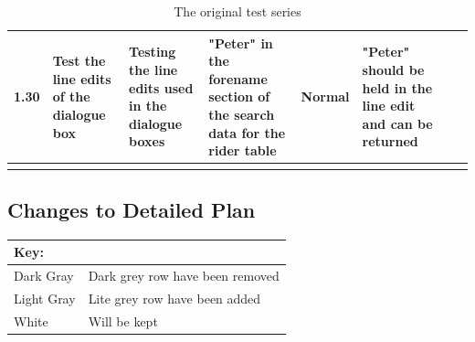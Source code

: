 \begin{landscape}
\begin{center}
\begin{longtable}{|p{1.5cm}|p{2.5cm}|p{2.5cm}|p{2cm}|p{2cm}|p{2cm}|p{2cm}|p{2cm}|}
        1.30 & Test the line edits of the dialogue box & Testing the line edits used in the dialogue boxes & "Peter" in the forename section of the search data for the rider table & Normal & "Peter" should be held in the line edit and can be returned & & \\ \hline
        \caption{The original test series}
        \label{tab:Original} 
    \end{longtable}
\end{center}



\subsection{Changes to Detailed Plan}

\begin{tabular}{|l|l|}
\hline
Key: & \\ \hline
\rowcolor{DarkGray} Dark Gray & Dark grey row have been removed \\ \hline
\rowcolor{LiteGray} Light Gray & Lite grey row have been added\\ \hline
White & Will be kept \\ \hline

\end{tabular}



\end{landscape}
